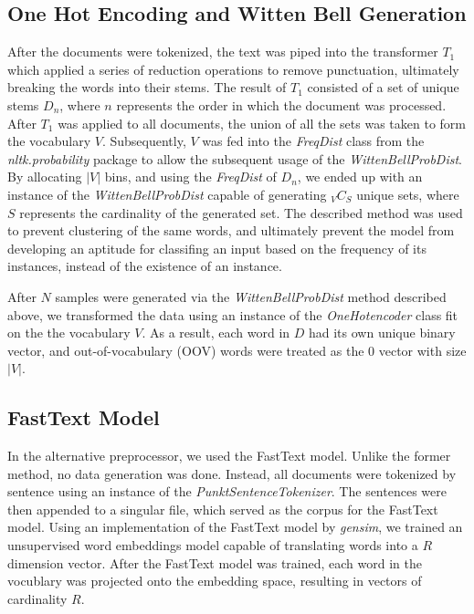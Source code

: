 \documentclass[12pt]{report}
\begin{document}
\subsection{One Hot Encoding and Witten Bell Generation}
After the documents were tokenized, the text was piped into the transformer $T_1$ which applied a
series of reduction operations to remove punctuation, ultimately breaking the words
into their stems. The result of $T_1$ consisted of a set of unique stems $D_n$,
where $n$ represents the order in which the document was processed.
After $T_1$ was applied to all documents, the union of all the sets was taken to
form the vocabulary $V$. Subsequently, $V$ was fed into the \emph{FreqDist} class from
the \emph{nltk.probability} package to allow the subsequent usage of the
\emph{WittenBellProbDist}. By allocating $|V|$ bins, and using the
\emph{FreqDist} of $D_n$, we ended up with an instance of the
\emph{WittenBellProbDist}\cite{bird2009natural} capable of generating ${}_{V}C_{S}$ unique sets,
where $S$ represents the cardinality of the generated set. The described method
was used to prevent clustering of the same words, and ultimately prevent the
model from developing an aptitude for classifing an input based on the
frequency of its instances, instead of the existence of an instance.


After $N$ samples were generated via the \emph{WittenBellProbDist} method\cite{bird2009natural}
described above, we transformed the data using an instance of the
\emph{OneHotencoder}\cite{scikit-learn} class fit on the the vocabulary $V$.
As a result, each word in $D$ had its own unique binary vector, and out-of-vocabulary (OOV)
words were treated as the $0$ vector with size $|V|$.

\subsection{FastText Model}
In the alternative preprocessor, we used the FastText model. Unlike the former method,
no data generation was done. Instead, all documents were tokenized by sentence using
an instance of the \emph{PunktSentenceTokenizer}\cite{bird2009natural}. The sentences were then appended to
a singular file, which served as the corpus for the FastText model. Using an implementation of
the FastText model by \emph{gensim}\cite{rehurek2011gensim}, we trained an unsupervised word embeddings model
capable of translating words into a $R$ dimension vector.
After the FastText model was trained, each word in the vocublary was projected onto
the embedding space, resulting in vectors of cardinality $R$.
\end{document}
